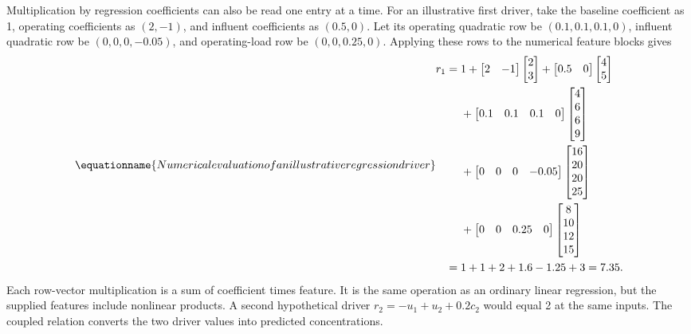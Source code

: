 Multiplication by regression coefficients can also be read one entry at a time. For an illustrative first driver, take the baseline coefficient as 1, operating coefficients as \((2,-1)\), and influent coefficients as \((0.5,0)\). Let its operating quadratic row be \((0.1,0.1,0.1,0)\), influent quadratic row be \((0,0,0,-0.05)\), and operating-load row be \((0,0,0.25,0)\). Applying these rows to the numerical feature blocks gives
\begin{equation}
\equationname{Numerical evaluation of an illustrative regression driver}
\label{eq:icsor_driver_multiplication_example}
\begin{aligned}
r_1={}&1+\begin{bmatrix}2&-1\end{bmatrix}\begin{bmatrix}2\\3\end{bmatrix}
+\begin{bmatrix}0.5&0\end{bmatrix}\begin{bmatrix}4\\5\end{bmatrix}\\
&+\begin{bmatrix}0.1&0.1&0.1&0\end{bmatrix}\begin{bmatrix}4\\6\\6\\9\end{bmatrix}\\
&+\begin{bmatrix}0&0&0&-0.05\end{bmatrix}\begin{bmatrix}16\\20\\20\\25\end{bmatrix}\\
&+\begin{bmatrix}0&0&0.25&0\end{bmatrix}\begin{bmatrix}8\\10\\12\\15\end{bmatrix}\\
={}&1+1+2+1.6-1.25+3=7.35.
\end{aligned}
\end{equation}
Each row-vector multiplication is a sum of coefficient times feature. It is the same operation as an ordinary linear regression, but the supplied features include nonlinear products. A second hypothetical driver \(r_2=-u_1+u_2+0.2c_2\) would equal 2 at the same inputs. The coupled relation converts the two driver values into predicted concentrations.


